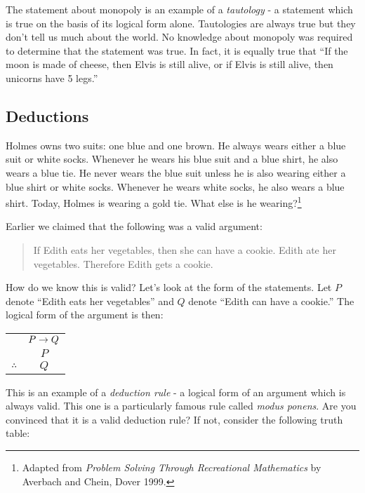 \documentclass[12pt]{article}
\begin{document}
The statement about monopoly is an example of a {\em tautology} - a statement which is true on the basis of its logical form alone.  Tautologies are always true but they don't tell us much about the world.  No knowledge about monopoly was required to determine that the statement was true.  In fact, it is equally true that ``If the moon is made of cheese, then Elvis is still alive, or if Elvis is still alive, then unicorns have 5 legs.''



\subsection{Deductions}

\begin{activity}
Holmes owns two suits: one blue and one brown.  He always wears either a blue suit or white socks.  Whenever he wears his blue suit and a blue shirt, he also wears a blue tie.  He never wears the blue suit unless he is also wearing either a blue shirt or white socks.  Whenever he wears white socks, he also wears a blue shirt.  Today, Holmes is wearing a gold tie.  What else is he wearing?\footnote{Adapted from \textit{Problem Solving Through Recreational Mathematics} by Averbach and Chein, Dover 1999.}

\end{activity}


Earlier we claimed that the following was a valid argument:
\begin{quote}
 If Edith eats her vegetables, then she can have a cookie.  Edith ate her vegetables.  Therefore Edith gets a cookie.
\end{quote}

How do we know this is valid?  Let's look at the form of the statements.  Let $P$ denote ``Edith eats her vegetables'' and $Q$ denote ``Edith can have a cookie.''  The logical form of the argument is then:

\begin{center}
 \begin{tabular}{rc}
  & $P \rightarrow Q$ \\
  & $P$ \\ \hline
  $\therefore$ & $Q$
 \end{tabular}
\end{center}

This is an example of a {\em deduction rule} - a logical form of an argument which is always valid.  This one is a particularly famous rule called {\em modus ponens}.  Are you convinced that it is a valid deduction rule?  If not, consider the following truth table:
\end{document}
